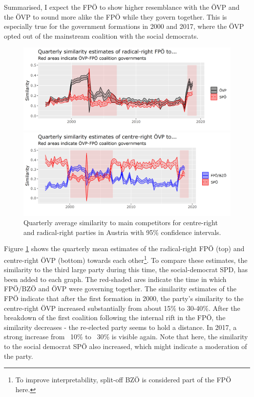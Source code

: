\documentclass{article}
\begin{document}
Summarised, I expect the FPÖ to show higher resemblance with the ÖVP and the ÖVP to sound more alike the FPÖ while they govern together. This is especially true for the government formations in 2000 and 2017, where the ÖVP opted out of the mainstream coalition with the social democrats. \par

\begin{figure}
\begin{minipage}{\textwidth}
\includegraphics[width=\linewidth]{AT/vis/AT_fp_paper.png}
\end{minipage}
\hfill
\begin{minipage}{\textwidth}
\includegraphics[width=\linewidth]{AT/vis/AT_vp_paper.png}
\end{minipage}
\caption{Quarterly average similarity to main competitors for centre-right and radical-right parties in Austria with 95\% confidence intervals.}
\label{fig:govs}
\end{figure}

Figure \ref{fig:govs} shows the quarterly mean estimates of the radical-right FPÖ (top) and centre-right ÖVP (bottom) towards each other\footnote{To improve interpretability, split-off BZÖ is considered part of the FPÖ here.}. To compare these estimates, the similarity to the third large party during this time, the social-democrat SPD, has been added to each graph. The red-shaded ares indicate the time in which FPÖ/BZÖ and ÖVP were governing together. The similarity estimates of the FPÖ indicate that after the first formation in 2000, the party's similarity to the centre-right ÖVP increased substantially from about 15\% to 30-40\%. After the breakdown of the first coalition following the internal rift in the FPÖ, the similarity decreases - the re-elected party seems to hold a distance. In 2017, a strong increase from ~10\% to ~30\% is visible again. Note that here, the similarity to the social democrat SPÖ also increased, which might indicate a moderation of the party.\par
\end{document}
